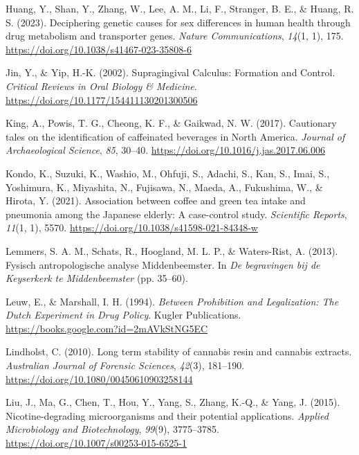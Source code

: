 \documentclass[
]{article}
\newlength{\cslhangindent}
\newlength{\cslentryspacingunit} %
\newenvironment{CSLReferences}[2] %
 {%
  \setlength{\parindent}{0pt}
  \ifodd #1
  \let\oldpar\par
  \def\par{\hangindent=\cslhangindent\oldpar}
  \fi
  \setlength{\parskip}{#2\cslentryspacingunit}
 }%
 {}
\begin{document}
\begin{CSLReferences}{1}{0}
\leavevmode{}%
Huang, Y., Shan, Y., Zhang, W., Lee, A. M., Li, F., Stranger, B. E., \&
Huang, R. S. (2023). Deciphering genetic causes for sex differences in
human health through drug metabolism and transporter genes. \emph{Nature
Communications}, \emph{14}(1, 1), 175.
\url{https://doi.org/10.1038/s41467-023-35808-6}

\leavevmode{}%
Jin, Y., \& Yip, H.-K. (2002). Supragingival {Calculus}: {Formation} and
{Control}. \emph{Critical Reviews in Oral Biology \& Medicine}.
\url{https://doi.org/10.1177/154411130201300506}

\leavevmode{}%
King, A., Powis, T. G., Cheong, K. F., \& Gaikwad, N. W. (2017).
Cautionary tales on the identification of caffeinated beverages in
{North America}. \emph{Journal of Archaeological Science}, \emph{85},
30--40. \url{https://doi.org/10.1016/j.jas.2017.06.006}

\leavevmode{}%
Kondo, K., Suzuki, K., Washio, M., Ohfuji, S., Adachi, S., Kan, S.,
Imai, S., Yoshimura, K., Miyashita, N., Fujisawa, N., Maeda, A.,
Fukushima, W., \& Hirota, Y. (2021). Association between coffee and
green tea intake and pneumonia among the {Japanese} elderly: A
case-control study. \emph{Scientific Reports}, \emph{11}(1, 1), 5570.
\url{https://doi.org/10.1038/s41598-021-84348-w}

\leavevmode{}%
Lemmers, S. A. M., Schats, R., Hoogland, M. L. P., \& Waters-Rist, A.
(2013). Fysisch antropologische analyse Middenbeemster. In \emph{De
begravingen bij de Keyserkerk te Middenbeemster} (pp. 35--60).

\leavevmode{}%
Leuw, E., \& Marshall, I. H. (1994). \emph{Between {Prohibition} and
{Legalization}: {The Dutch Experiment} in {Drug Policy}}. {Kugler
Publications}. \url{https://books.google.com?id=2mAVkStNG5EC}

\leavevmode{}%
Lindholst, C. (2010). Long term stability of cannabis resin and cannabis
extracts. \emph{Australian Journal of Forensic Sciences}, \emph{42}(3),
181--190. \url{https://doi.org/10.1080/00450610903258144}

\leavevmode{}%
Liu, J., Ma, G., Chen, T., Hou, Y., Yang, S., Zhang, K.-Q., \& Yang, J.
(2015). Nicotine-degrading microorganisms and their potential
applications. \emph{Applied Microbiology and Biotechnology},
\emph{99}(9), 3775--3785.
\url{https://doi.org/10.1007/s00253-015-6525-1}


\end{CSLReferences}
\end{document}
